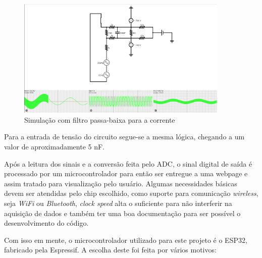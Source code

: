 \begin{figure}[htb!]
    \caption{Simulação com filtro passa-baixa para a corrente}
    \label{fig:simco2}
    \includegraphics[width=0.9\textwidth]{figuras/sim-co-2.png}
    \fonte{}
\end{figure}

Para a entrada de tensão do circuito segue-se a mesma lógica, chegando a um valor de aproximadamente 5 nF.

Após a leitura dos sinais e a conversão feita pelo ADC, o sinal digital de saída é processado por um microcontrolador para então ser entregue a uma webpage e assim tratado para visualização pelo usuário. Algumas necessidades básicas devem ser atendidas pelo chip escolhido, como suporte para comunicação \textit{wireless}, seja \textit{WiFi} ou \textit{Bluetooth}, \textit{clock speed} alta o suficiente para não interferir na aquisição de dados e também ter uma boa documentação para ser possível o desenvolvimento do código.

Com isso em mente, o microcontrolador utilizado para este projeto é o ESP32, fabricado pela Espressif. A escolha deste foi feita por vários motivos:

